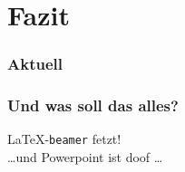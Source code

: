 \documentclass{beamer}
\begin{document}
\section{Fazit}

\begin{frame}
  \frametitle{Aktuell}
  \tableofcontents[currentsection]{}
\end{frame}

\begin{frame}
  \frametitle{Und was soll das alles?}

  \onslide<+->

  \begin{center}
    \LaTeX{}-\texttt{beamer} fetzt! \\
    \onslide<+->
    \dots und Powerpoint ist doof \dots
  \end{center}

\end{frame}
\end{document}
